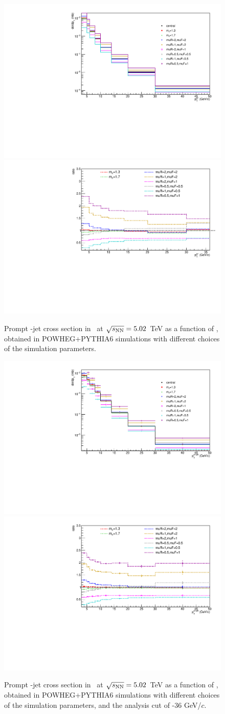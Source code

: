 \begin{figure}[bth]
\begin{center}
\includegraphics[width=.45\textwidth]{pPbplots/simulations/Promptspectra_DPt}
\includegraphics[width=.45\textwidth]{pPbplots/simulations/Promptspectra_DPt_ratio}
\caption{Prompt \Dstar-jet cross section in \pPb\ at $\sqrt{s_{\rm NN}}=5.02$~TeV as a function of \ptd, obtained in POWHEG+PYTHIA6 simulations with different choices of the simulation parameters.} 
\label{fig:PromptDJetsPrediction_DPtSpectrum_GeneratorLevel_DPtSpectrum}
\end{center}
\end{figure}

\begin{figure}[bth]
\begin{center}
\includegraphics[width=.45\textwidth]{pPbplots/simulations/Promptspectra_JetPt_Dpt3_36}
\includegraphics[width=.45\textwidth]{pPbplots/simulations/Promptspectra_JetPt_Dpt3_36_ratio}
\caption{Prompt \Dstar-jet cross section in \pPb\ at $\sqrt{s_{\rm NN}}=5.02$~TeV as a function of \ptchjet, obtained in POWHEG+PYTHIA6 simulations
with different choices of the simulation parameters, and the analysis cut of \ptd{}-36 GeV/$c$.} 
\label{fig:PromptDJetsPrediction_JetPtSpectrum_GeneratorLevel_DPtSpectrum}
\end{center}
\end{figure}

